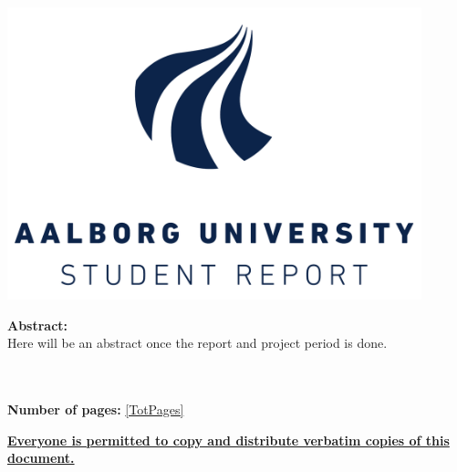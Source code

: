  ~
\begin{minipage}[T]{0.45\textwidth}
 \begin{flushright}
  \includegraphics[width=0.9\textwidth]{images/aau_logo.pdf}\\
 \end{flushright}
 \begin{flushleft}
  \textbf{Abstract:}\\
  Here will be an abstract once the report and project period is done.%
 \end{flushleft}
\end{minipage}\\
\\\large{\textsf{\textbf{\normalsize{Number of pages:}}}} \ref{TotPages}\\
\begin{center}
 \begin{scriptsize}
  \textbf{\underline{Everyone is permitted to copy and distribute verbatim copies of this document.}}
 \end{scriptsize}
\end{center}
